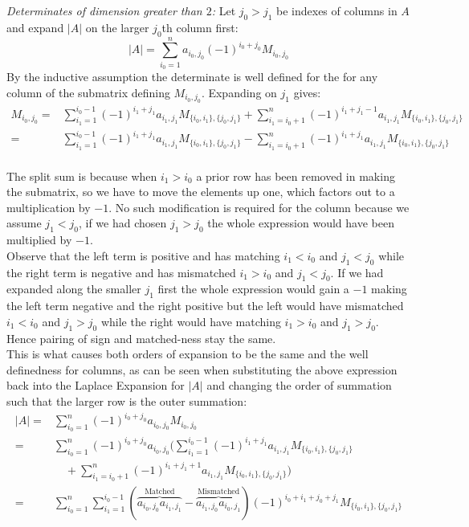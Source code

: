 \textit{Determinates of dimension greater than $2$:}
Let $j_0>j_1$ be indexes of columns in $A$ and expand $|A|$ on the larger $j_0$th column first:
\[|A| = \sum_{i_0=1}^na_{i_0,j_0}(-1)^{i_0+j_0}M_{i_0,j_0}\]
By the inductive assumption the determinate is well defined for the for any column of the submatrix defining $M_{i_0,j_0}$.
Expanding on $j_1$ gives:
\begin{equation*}
	\begin{aligned}
		M_{i_0,j_0}=&\sum_{i_1=1}^{i_0-1}(-1)^{i_1+j_1}a_{i_1,j_1}M_{\{i_0,i_1\},\{j_0,j_1\}}+\sum_{i_1=i_0+1}^{n}(-1)^{i_1+j_1-1}a_{i_1,j_1}M_{\{i_0,i_1\},\{j_0,j_1\}}\\
		=&\sum_{i_1=1}^{i_0-1}(-1)^{i_1+j_1}a_{i_1,j_1}M_{\{i_0,i_1\},\{j_0,j_1\}}-\sum_{i_1=i_0+1}^{n}(-1)^{i_1+j_1}a_{i_1,j_1}M_{\{i_0,i_1\},\{j_0,j_1\}}\\
	\end{aligned}
\end{equation*}

The split sum is because when $i_1>i_0$ a prior row has been removed in making the submatrix,
so we have to move the elements up one,
which factors out to a multiplication by $-1$.
No such modification is required for the column because we assume $j_1<j_0$,
if we had chosen $j_1 > j_0$ the whole expression would have been multiplied by $-1$.
\\

Observe that the left term is positive and has matching $i_1< i_0$ and $j_1 < j_0$ while the right term is negative and has mismatched $i_1> i_0$ and $j_1 < j_0$.
If we had expanded along the smaller $j_1$ first the whole expression would gain a $-1$ making the left term negative and the right positive but the left would have mismatched $i_1< i_0$ and $j_1 > j_0$ while the right would have matching $i_1 > i_0$ and $j_1 > j_0$.
Hence pairing of sign and matched-ness stay the same.
\\

This is what causes both orders of expansion to be the same and the well definedness for columns,
as can be seen when substituting the above expression back into the Laplace Expansion for $|A|$ and changing the order of summation such that the larger row is the outer summation:
\begin{equation*}
\begin{aligned}
	|A|=&\sum_{i_0=1}^{n}(-1)^{i_0+j_0}a_{i_0,j_0}M_{i_0,j_0} \\
	=&\sum_{i_0=1}^{n}(-1)^{i_0+j_0}a_{i_0,j_0}\bigg(
		\sum_{i_1=1}^{i_0-1}(-1)^{i_1+j_1}a_{i_1,j_1}M_{\{i_0,i_1\},\{j_0,j_1\}}\\
		&\quad+\sum_{i_1=i_0+1}^{n}(-1)^{i_1+j_1+1}a_{i_1,j_1}M_{\{i_0,i_1\},\{j_0,j_1\}}
	\bigg) \\
	=&\sum_{i_0=1}^{n}\sum_{i_1=1}^{i_0-1}(\overbrace{a_{i_0,j_0}a_{i_1,j_1}}^\text{Matched}-\overbrace{a_{i_1,j_0}a_{i_0,j_1}}^\text{Mismatched})(-1)^{i_0+i_1+j_0+j_1}M_{\{i_0,i_1\},\{j_0,j_1\}} \\
\end{aligned}
\end{equation*}

